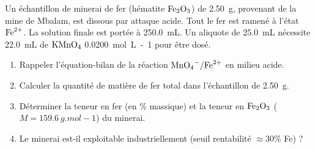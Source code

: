 \documentclass[11pt]{article}
\begin{document}
\begin{exercice}
Un échantillon de minerai de fer (hématite $\ce{Fe2O3}$) de \SI{2.50}{g}, provenant de la mine de Mbalam, est dissous par attaque acide. Tout le fer est ramené à l'état $\ce{Fe^{2+}}$. La solution finale est portée à \SI{250.0}{mL}. Un aliquote de \SI{25.0}{mL} nécessite \SI{22.0}{mL} de $\ce{KMnO4}$ \SI{0.0200}{mol.L-1} pour être dosé.
\begin{enumerate}
    \item Rappeler l'équation-bilan de la réaction $\ce{MnO4-}/\ce{Fe^{2+}}$ en milieu acide.
    \item Calculer la quantité de matière de fer total dans l'échantillon de \SI{2.50}{g}.
    \item Déterminer la teneur en fer (en \% massique) et la teneur en $\ce{Fe2O3}$ ($M = \SI{159.6}{g.mol-1}$) du minerai.
    \item Le minerai est-il exploitable industriellement (seuil rentabilité $\approx 30\%$ Fe) ?
\end{enumerate}
\end{exercice}
\end{document}
